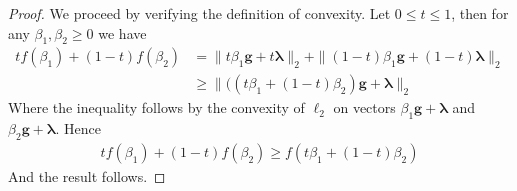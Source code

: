 \documentclass[10pt,a4paper]{amsart}
\newcommand{\bg}{\mathbf{g}}
\newcommand{\blambda}{\bm{\lambda}}
\begin{document}
\begin{proof}
    We proceed by verifying the definition of convexity. Let $0\le t\le 1$, then for any $\beta_1, \beta_2 \ge 0$ we have
    \begin{align*}
        t f(\beta_1) + (1-t) f(\beta_2) &= \|t \beta_1 \bg + t \blambda \|_2 +   \|(1-t) \beta_1 \bg + (1-t) \blambda \|_2 \\
        &\ge \|((t \beta_1 + (1-t) \beta_2) \bg + \blambda \|_2
    \end{align*}
    Where the inequality follows by the convexity of $\ell_2$ on vectors $\beta_1 \bg +  \blambda$ and $\beta_2 \bg +  \blambda$. Hence
    \begin{align*}
        t f(\beta_1) + (1-t) f(\beta_2) \ge f(t\beta_1 + (1-t) \beta_2)
    \end{align*}
    And the result follows.
\end{proof}
\end{document}

